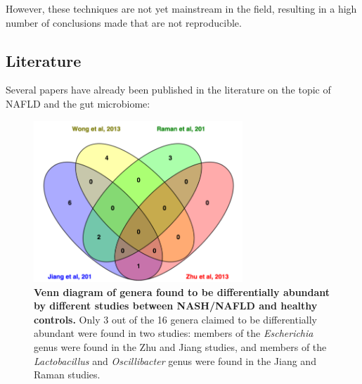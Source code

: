 However, these techniques are not yet mainstream in the field, resulting in a high number of conclusions made that are not reproducible.

\subsection{Literature}
Several papers have already been published in the literature on the topic of NAFLD and the gut microbiome:

\begin{figure}[h]
\begin{center}
\includegraphics[width=0.7\textwidth]{nafld_papers.png}
\caption[Venn diagram of genera found to be differentially abundant by different studies between NASH/NAFLD and healthy controls.]{\textbf{Venn diagram of genera found to be differentially abundant by different studies between NASH/NAFLD and healthy controls.} Only 3 out of the 16 genera claimed to be differentially abundant were found in two studies: members of the \textit{Escherichia} genus were found in the Zhu \cite{zhu2013characterization} and Jiang \cite{jiang2015dysbiosis} studies, and members of the \textit{Lactobacillus} and \textit{Oscillibacter} genus were found in the Jiang \cite{jiang2015dysbiosis} and Raman \cite{raman2013fecal} studies.}
\end{center}
\label{nafld_fig1}
\end{figure}


